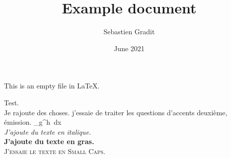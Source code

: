 \documentclass[12pt, letterpaper,twoside]{article}
\title{Example document}
\author{Sebastien Gradit}
\date{June 2021}
\begin{document}
    


    \maketitle

    This is an empty file in \LaTeX.

    Test.\\

    Je rajoute des choses. j'essaie de traiter les questions d'accents deuxième, émission.
\rho \int_{g}^{h}   \,dx \\

\textit{J'ajoute du texte en italique.} \\

\textbf{J'ajoute du texte en gras.} \\

\textsc{J'essaie le texte en Small Caps.}

\alpha \beta 
\end{document}

